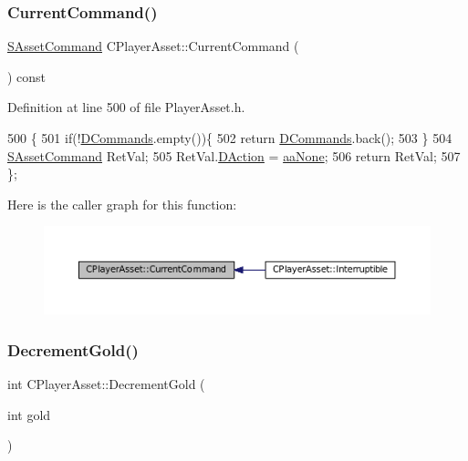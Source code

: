 \subsubsection{\texorpdfstring{Current\+Command()}{CurrentCommand()}}
{\footnotesize\ttfamily \hyperlink{structSAssetCommand}{S\+Asset\+Command} C\+Player\+Asset\+::\+Current\+Command (\begin{DoxyParamCaption}{ }\end{DoxyParamCaption}) const\hspace{0.3cm}{\ttfamily [inline]}}



Definition at line 500 of file Player\+Asset.\+h.


\begin{DoxyCode}
500                                             \{
501             \textcolor{keywordflow}{if}(!\hyperlink{classCPlayerAsset_a4d3b96106d3b1c1020f98005884d2a87}{DCommands}.empty())\{
502                 \textcolor{keywordflow}{return} \hyperlink{classCPlayerAsset_a4d3b96106d3b1c1020f98005884d2a87}{DCommands}.back();
503             \}
504             \hyperlink{structSAssetCommand}{SAssetCommand} RetVal;
505             RetVal.\hyperlink{structSAssetCommand_a8edd3b3d59a76d5514ba403bc8076a75}{DAction} = \hyperlink{GameDataTypes_8h_ab47668e651a3032cfb9c40ea2d60d670ac17cc5a0035320c060d7f8074143b507}{aaNone};
506             \textcolor{keywordflow}{return} RetVal;
507         \};
\end{DoxyCode}
Here is the caller graph for this function\+:\nopagebreak
\begin{figure}[H]
\begin{center}
\leavevmode
\includegraphics[width=350pt]{classCPlayerAsset_ae2040e12e5319593c9a2d724c7b7eda0_icgraph}
\end{center}
\end{figure}
\hypertarget{classCPlayerAsset_ab29218b9af24ca9db186ee36f75ae7d4}{}\label{classCPlayerAsset_ab29218b9af24ca9db186ee36f75ae7d4} 
\subsubsection{\texorpdfstring{Decrement\+Gold()}{DecrementGold()}}
{\footnotesize\ttfamily int C\+Player\+Asset\+::\+Decrement\+Gold (\begin{DoxyParamCaption}\item[{int}]{gold }\end{DoxyParamCaption})\hspace{0.3cm}{\ttfamily [inline]}}



